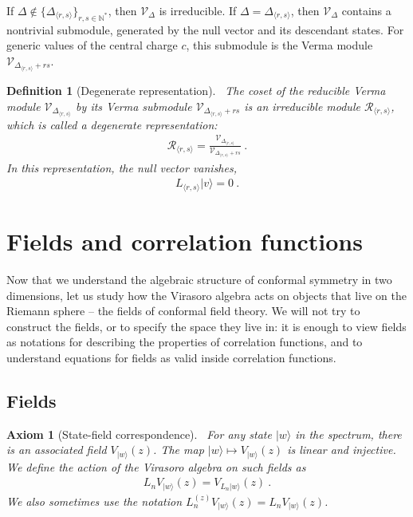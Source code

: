 \documentclass[12pt, a4paper]{article}
\theoremstyle{break}
\newtheorem{hyp}[exo]{Axiom}
\newtheorem{defn}[exo]{Definition}
\begin{document}
If $\Delta\notin\{\Delta_{\langle r,s\rangle}\}_{r,s\in\mathbb{N}^*}$, then $\mathcal V_\Delta$ is irreducible. If $\Delta = \Delta_{\langle r,s\rangle}$, then $\mathcal V_\Delta$ contains a nontrivial submodule, generated by the null vector and its descendant states. For generic values of the central charge $c$, this submodule is the Verma module $\mathcal V_{\Delta_{\langle r,s\rangle}+rs}$.

\begin{defn}[Degenerate representation]
 ~\label{def:deg}
The coset of the reducible Verma module $\mathcal V_{\Delta_{\langle r,s\rangle}}$ by its Verma submodule $\mathcal V_{\Delta_{\langle r,s\rangle}+rs}$ is an irreducible module $\mathcal{R}_{\langle r,s\rangle}$, which is called a degenerate representation:
\begin{align}
 \mathcal{R}_{\langle r,s\rangle} = \frac{\mathcal V_{\Delta_{\langle r,s\rangle}}}{\mathcal V_{\Delta_{\langle r,s\rangle}+rs}}\ .
\end{align}
In this representation, the null vector vanishes,
\begin{align}
 L_{\langle r,s\rangle}|v\rangle = 0\ .
\end{align}
\end{defn}


\section{Fields and correlation functions}\label{sec:cft}

Now that we understand the algebraic structure of conformal symmetry in two dimensions, let us study how the Virasoro algebra acts on objects that live on the Riemann sphere -- the fields of conformal field theory. We will not try to construct the fields, or to specify the space they live in: it is enough to view fields as notations for describing the properties of correlation functions, and to understand equations for fields as valid inside correlation functions.


\subsection{Fields}

\begin{hyp}[State-field correspondence]
 ~\label{hyp:sfc}
For any state $|w\rangle$ in the spectrum, there is an associated field $V_{|w\rangle}(z)$. The map $|w\rangle \mapsto V_{|w\rangle}(z)$ is linear and injective. We define the action of the Virasoro algebra on such fields as 
\begin{align}
 L_n V_{|w\rangle}(z) =   V_{L_n|w\rangle}(z)\ .
\end{align}
We also sometimes use the notation $L_n^{(z)} V_{|w\rangle}(z)=L_n V_{|w\rangle}(z)$. 
\end{hyp}
\end{document}
